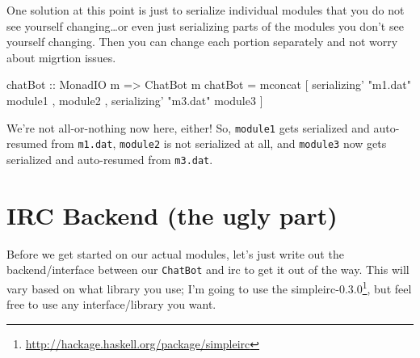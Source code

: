 \documentclass[]{article}
\newenvironment{Shaded}{}{}
\newcommand{\DataTypeTok}[1]{\textcolor[rgb]{0.56,0.13,0.00}{{#1}}}
\newcommand{\StringTok}[1]{\textcolor[rgb]{0.25,0.44,0.63}{{#1}}}
\newcommand{\OtherTok}[1]{\textcolor[rgb]{0.00,0.44,0.13}{{#1}}}
\newcommand{\FunctionTok}[1]{\textcolor[rgb]{0.02,0.16,0.49}{{#1}}}
\newcommand{\NormalTok}[1]{{#1}}
\renewcommand{\href}[2]{#2\footnote{\url{#1}}}
\begin{document}
One solution at this point is just to serialize individual modules that
you do not see yourself changing\ldots{}or even just serializing parts
of the modules you don't see yourself changing. Then you can change each
portion separately and not worry about migrtion issues.

\begin{Shaded}
\begin{Highlighting}[]
\OtherTok{chatBot ::} \DataTypeTok{MonadIO} \NormalTok{m }\OtherTok{=>} \DataTypeTok{ChatBot} \NormalTok{m}
\NormalTok{chatBot }\FunctionTok{=} \NormalTok{mconcat [ serializing' }\StringTok{"m1.dat"} \NormalTok{module1}
                  \NormalTok{, module2}
                  \NormalTok{, serializing' }\StringTok{"m3.dat"} \NormalTok{module3}
                  \NormalTok{]}
\end{Highlighting}
\end{Shaded}

We're not all-or-nothing now here, either! So, \texttt{module1} gets
serialized and auto-resumed from \texttt{m1.dat}, \texttt{module2} is
not serialized at all, and \texttt{module3} now gets serialized and
auto-resumed from \texttt{m3.dat}.

\section{IRC Backend (the ugly part)}\label{irc-backend-the-ugly-part}

Before we get started on our actual modules, let's just write out the
backend/interface between our \texttt{ChatBot} and irc to get it out of
the way. This will vary based on what library you use; I'm going to use
the
\href{http://hackage.haskell.org/package/simpleirc}{simpleirc-0.3.0},
but feel free to use any interface/library you want.
\end{document}
